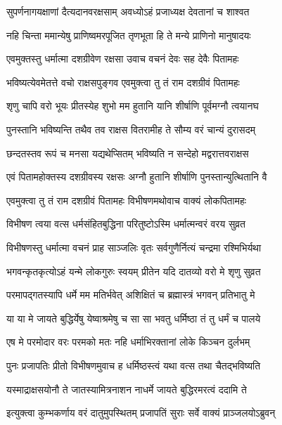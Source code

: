 \twolineshloka
{सुपर्णनागयक्षाणां दैत्यदानवरक्षसाम्}
{अवध्योऽहं प्रजाध्यक्ष देवतानां च शाश्वत} %

\twolineshloka
{नहि चिन्ता ममान्येषु प्राणिष्वमरपूजित}
{तृणभूता हि ते मन्ये प्राणिनो मानुषादयः} %

\twolineshloka
{एवमुक्तस्तु धर्मात्मा दशग्रीवेण रक्षसा}
{उवाच वचनं देवः सह देवैः पितामहः} %

\twolineshloka
{भविष्यत्येवमेतत्ते वचो राक्षसपुङ्गव}
{एवमुक्त्वा तु तं राम दशग्रीवं पितामहः} %

\twolineshloka
{शृणु चापि वरो भूयः प्रीतस्येह शुभो मम}
{हुतानि यानि शीर्षाणि पूर्वमग्नौ त्वयानघ} %

\twolineshloka
{पुनस्तानि भविष्यन्ति तथैव तव राक्षस}
{वितरामीह ते सौम्य वरं चान्यं दुरासदम्} %

\twolineshloka
{छन्दतस्तव रूपं च मनसा यद्यथेप्सितम्}
{भविष्यति न सन्देहो मद्वरात्तवराक्षस} %

\twolineshloka
{एवं पितामहोक्तस्य दशग्रीवस्य रक्षसः}
{अग्नौ हुतानि शीर्षाणि पुनस्तान्युत्थितानि वै} %

\twolineshloka
{एवमुक्त्वा तु तं राम दशग्रीवं पितामहः}
{विभीषणमथोवाच वाक्यं लोकपितामहः} %

\twolineshloka
{विभीषण त्वया वत्स धर्मसंहितबुद्धिना}
{परितुष्टोऽस्मि धर्मात्मन्वरं वरय सुव्रत} %

\twolineshloka
{विभीषणस्तु धर्मात्मा वचनं प्राह साञ्जलिः}
{वृतः सर्वगुणैर्नित्यं चन्द्रमा रश्मिभिर्यथा} %

\twolineshloka
{भगवन्कृतकृत्योऽहं यन्मे लोकगुरुः स्वयम्}
{प्रीतेन यदि दातव्यो वरो मे शृणु सुव्रत} %

\twolineshloka
{परमापद्गतस्यापि धर्मे मम मतिर्भवेत्}
{अशिक्षितं च ब्रह्मास्त्रं भगवन् प्रतिभातु मे} %

\twolineshloka
{या या मे जायते बुद्धिर्येषु येष्वाश्रमेषु च}
{सा सा भवतु धर्मिष्ठा तं तु धर्मं च पालये} %

\twolineshloka
{एष मे परमोदार वरः परमको मतः}
{नहि धर्माभिरक्तानां लोके किञ्चन दुर्लभम्} %

\twolineshloka
{पुनः प्रजापतिः प्रीतो विभीषणमुवाच ह}
{धर्मिष्ठस्त्वं यथा वत्स तथा चैतद्भविष्यति} %

\twolineshloka
{यस्माद्राक्षसयोनौ ते जातस्यामित्रनाशन}
{नाधर्मे जायते बुद्धिरमरत्वं ददामि ते} %

\twolineshloka
{इत्युक्त्वा कुम्भकर्णाय वरं दातुमुपस्थितम्}
{प्रजापतिं सुराः सर्वे वाक्यं प्राञ्जलयोऽब्रुवन्} %

